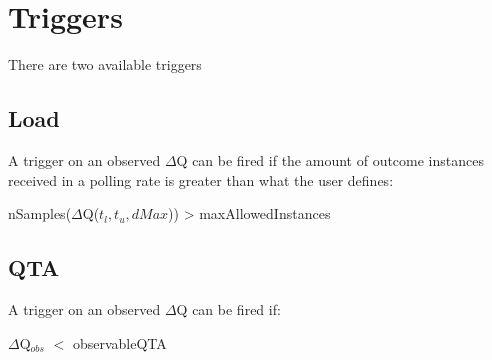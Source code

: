 \section{Triggers}
    There are two available triggers
    \subsection{Load}
        A trigger on an observed $\Delta$Q can be fired if the amount of outcome instances received in a polling rate is greater than what the user defines:
    \begin{center}
        nSamples($\Delta$Q($t_l, t_u, dMax$)) > maxAllowedInstances 
    \end{center}

    \subsection{QTA}
        A trigger on an observed $\Delta$Q can be fired if:
        \begin{center}
            $\Delta$Q$_{obs}$ $<$ observableQTA
        \end{center}
